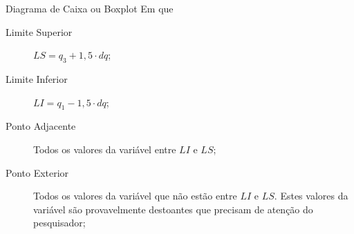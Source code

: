 \documentclass[8pt]{beamer}
\begin{document}
\begin{frame}{Diagrama de Caixa ou Boxplot}
 Em que
 \begin{description}
  \item[Limite Superior] $LS = q_3 + 1,5 \cdot dq$;
  \vfill
  
  \item[Limite Inferior] $LI = q_1 - 1,5 \cdot dq$;
  \vfill
  
  \item[Ponto Adjacente] Todos os valores da variável entre $LI$ e $LS$;
  \vfill
  
  \item[Ponto Exterior] Todos os valores da variável que não estão entre $LI$ e $LS$. Estes valores da variável são provavelmente destoantes que precisam de atenção do pesquisador;
 \end{description}

\end{frame}

% 
%
%
\end{document}
